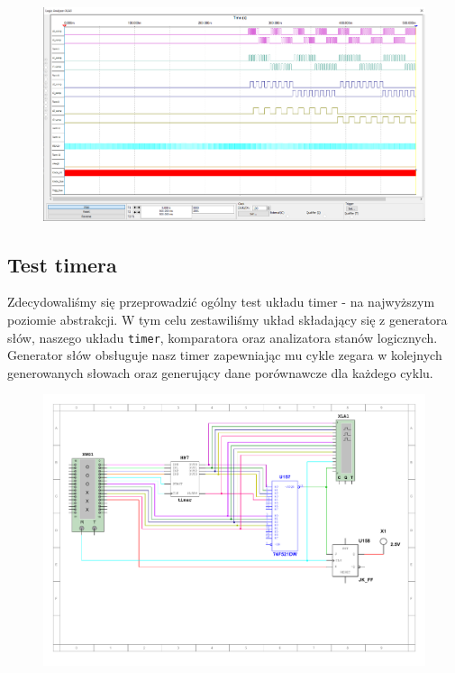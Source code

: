\documentclass[a4paper]{article}
\begin{document}
\begin{figure}[H]
    \centering
    \includegraphics[width=\textwidth]{component_test_logic_analyzer_xla3_setter.png}
\end{figure}

\pagebreak
\subsection{Test timera}
Zdecydowaliśmy się przeprowadzić ogólny test układu timer - na najwyższym poziomie abstrakcji.
W tym celu zestawiliśmy układ składający się z generatora słów, naszego układu \verb|timer|, komparatora oraz analizatora
stanów logicznych. Generator słów obsługuje nasz timer zapewniając mu cykle zegara w kolejnych 
generowanych słowach oraz generujący dane porównawcze dla każdego cyklu.

\begin{figure}[H]
    \centering
    \includegraphics[width=\textwidth]{general_test.pdf}
\end{figure}
\end{document}
